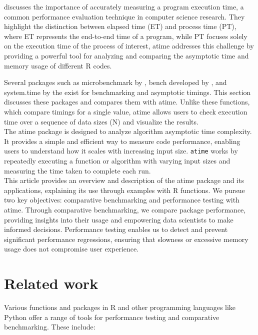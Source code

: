 \noindent \cite{suh2017emp} discusses the importance of accurately measuring a program execution time, a common performance evaluation technique in computer science research. They  highlight the distinction between elapsed time (ET) and process time (PT), where ET represents the end-to-end time of a program, while PT focuses solely on the execution time of the process of interest, atime addresses this challenge by providing a powerful tool for analyzing and comparing the asymptotic time and memory usage of different R codes.


\noindent Several packages such as microbenchmark by \cite{microbenchmark}, bench developed by \cite{bench}, and system.time by the \cite{system.time} exist for benchmarking and asymptotic timings. This section discusses these packages and compares them with atime. Unlike these functions, which compare timings for a single value, atime allows users to check execution time over a sequence of data sizes (N) and visualize the results.
\\ 
 
\noindent The atime package is designed to analyze algorithm asymptotic time complexity. It provides a simple and efficient way to measure code performance, enabling users to understand how it scales with increasing input size. \texttt{atime} works by repeatedly executing a function or algorithm with varying input sizes and measuring the time taken to complete each run. \\

\noindent This article provides an overview and description of the atime package and its applications, explaining its use through examples with R functions. We pursue two key objectives: comparative benchmarking and performance testing with atime. Through comparative benchmarking, we compare package performance, providing insights into their usage and empowering data scientists to make informed decisions. Performance testing enables us to detect and prevent significant performance regressions, ensuring that slowness or excessive memory usage does not compromise user experience.\\

\section{Related work}

\noindent Various functions and packages in R and other programming languages like Python offer a range of tools for performance testing and comparative benchmarking. These include: 
\\

